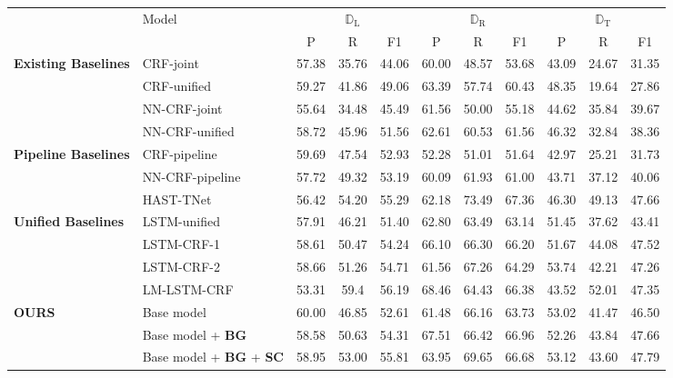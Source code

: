 \documentclass[letterpaper]{article} \usepackage{aaai19}  \usepackage{times}  \usepackage{helvet}  \usepackage{courier}  \usepackage{url}  \usepackage{graphicx}  \frenchspacing  \setlength{\pdfpagewidth}{8.5in}  \setlength{\pdfpageheight}{11in}
\begin{document}
\begin{table*}[]
    \centering
    \begin{tabular}{ll|ccc|ccc|ccc}
    \Xhline{3\arrayrulewidth}
        & \multirow{2}{*}{Model} & \multicolumn{3}{c|}{$\mathbb{D}_{\text{L}}$} & \multicolumn{3}{c|}{$\mathbb{D}_{\text{R}}$} & \multicolumn{3}{c}{$\mathbb{D}_{\text{T}}$}\\ \cline{3-11} 
        & & P & R & F1 & P & R & F1 & P & R & F1 \\ \hline \hline
        \multirow{4}{*}{\textbf{Existing Baselines}} & CRF-joint & 57.38 & 35.76 & 44.06 & 60.00 & 48.57 & 53.68 & 43.09 & 24.67 & 31.35 \\
        & CRF-unified & 59.27 & 41.86 & 49.06 & 63.39 & 57.74 & 60.43 & 48.35 & 19.64 & 27.86 \\ 
        & NN-CRF-joint & 55.64 & 34.48 & 45.49 & 61.56 & 50.00 & 55.18 & 44.62 & 35.84 & 39.67 \\
        & NN-CRF-unified & 58.72 & 45.96 & 51.56 & 62.61 & 60.53 & 61.56 & 46.32 & 32.84 & 38.36 \\ \hline
\multirow{3}{*}{\textbf{Pipeline Baselines}} & CRF-pipeline & 59.69 & 47.54 & 52.93 & 52.28 & 51.01 & 51.64 & 42.97 & 25.21 & 31.73 \\
        & NN-CRF-pipeline & 57.72 & 49.32 & 53.19 & 60.09 & 61.93 & 61.00 & 43.71 & 37.12 & 40.06 \\
        & HAST-TNet & 56.42 & 54.20 & 55.29 & 62.18 & 73.49 & 67.36 & 46.30 & 49.13 & 47.66 \\ \hline
        \multirow{4}{*}{\textbf{Unified Baselines}} & LSTM-unified & 57.91 & 46.21 & 51.40 & 62.80 & 63.49 & 63.14 & 51.45 & 37.62 & 43.41 \\
        &LSTM-CRF-1 & 58.61 & 50.47 & 54.24 & 66.10 & 66.30 & 66.20 & 51.67 & 44.08 & 47.52 \\
        & LSTM-CRF-2 & 58.66 & 51.26 & 54.71 & 61.56 & 67.26 & 64.29 & 53.74 & 42.21 & 47.26 \\
        & LM-LSTM-CRF & 53.31 & 59.4 & 56.19 & 68.46 & 64.43 & 66.38 & 43.52 & 52.01 & 47.35 \\ \hline
        \multirow{5}{*}{\textbf{OURS}}  
        & Base model & 60.00 & 46.85 & 52.61 & 61.48 & 66.16 & 63.73 & 53.02 & 41.47 & 46.50 \\
        & Base model + \textbf{BG} & 58.58 & 50.63 & 54.31 & 67.51 & 66.42 & 66.96 & 52.26 & 43.84 & 47.66 \\
        & Base model + \textbf{BG} + \textbf{SC} & 58.95 & 53.00 & 55.81 & 63.95 & 69.65 & 66.68 & 53.12 & 43.60 & 47.79 \\

\end{tabular}
\end{table*}
\end{document}
